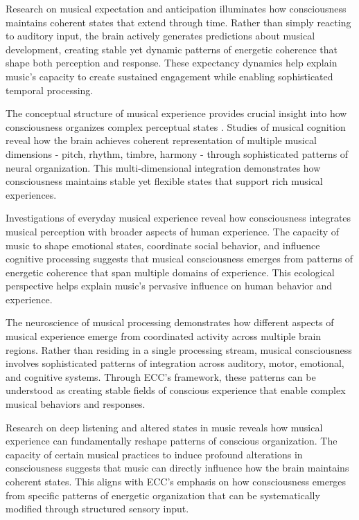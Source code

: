 \begin{refsection}
Research on musical expectation and anticipation \cite{Huron2006} illuminates how consciousness maintains coherent states that extend through time. Rather than simply reacting to auditory input, the brain actively generates predictions about musical development, creating stable yet dynamic patterns of energetic coherence that shape both perception and response. These expectancy dynamics help explain music's capacity to create sustained engagement while enabling sophisticated temporal processing.

The conceptual structure of musical experience provides crucial insight into how consciousness organizes complex perceptual states \cite{Zbikowski2002}. Studies of musical cognition reveal how the brain achieves coherent representation of multiple musical dimensions - pitch, rhythm, timbre, harmony - through sophisticated patterns of neural organization. This multi-dimensional integration demonstrates how consciousness maintains stable yet flexible states that support rich musical experiences.

Investigations of everyday musical experience \cite{DeNora2000} reveal how consciousness integrates musical perception with broader aspects of human experience. The capacity of music to shape emotional states, coordinate social behavior, and influence cognitive processing suggests that musical consciousness emerges from patterns of energetic coherence that span multiple domains of experience. This ecological perspective helps explain music's pervasive influence on human behavior and experience.

The neuroscience of musical processing \cite{Peretz2005} demonstrates how different aspects of musical experience emerge from coordinated activity across multiple brain regions. Rather than residing in a single processing stream, musical consciousness involves sophisticated patterns of integration across auditory, motor, emotional, and cognitive systems. Through ECC's framework, these patterns can be understood as creating stable fields of conscious experience that enable complex musical behaviors and responses.

Research on deep listening and altered states in music \cite{Becker2004} reveals how musical experience can fundamentally reshape patterns of conscious organization. The capacity of certain musical practices to induce profound alterations in consciousness suggests that music can directly influence how the brain maintains coherent states. This aligns with ECC's emphasis on how consciousness emerges from specific patterns of energetic organization that can be systematically modified through structured sensory input.


\end{refsection}
